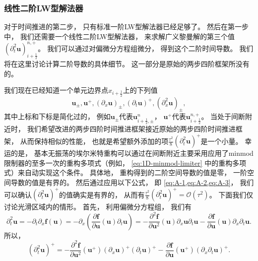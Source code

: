 \subsubsection{线性二阶LW型解法器}

对于时间推进的第二步，
只有标准一阶LW型解法器已经足够了。
然后在第一步中，
我们还需要一个线性二阶LW型解法器，
来求解广义黎曼解的第三个值$\left({\partial_{t}^2}{\bm{u}}\right)_{i+\frac{1}{2}}^{n, +}$。
我们可以通过对偏微分方程组微分，
得到这个二阶时间导数。
我们将在这里讨论计算二阶导数的具体细节。
这一部分是原始的两步四阶框架所没有的。

我们现在已经知道一个单元边界点$x_{i+\frac{1}{2}}$上的下列值
\begin{equation}
  {\bm{u}}_\pm, {\bm{u}}^+,\left({\partial_{x}}{\bm{u}}\right)_\pm, \left({\partial_{t}} {\bm{u}}\right)^+, \left({\partial_{x}^2}{\bm{u}}\right)_\pm,
\end{equation}
其中上标和下标是简化过的，
例如${\bm{u}}_\pm$代表${\bm{u}}_{i+\frac{1}{2},\pm}^n$，
${\bm{u}}^+$代表${\bm{u}}_{i+\frac{1}{2}}^{n,+}$。
当处于间断附近时，
我们希望改进的两步四阶时间推进框架接近原始的两步四阶时间推进框架，
从而保持相似的性能，
也就是希望额外添加的项$\frac{\tau^2}{8}\left({\partial_{t}^2} \bm{u}\right)^+$是一个小量。
幸运的是，
基本无振荡的埃尔米特重构可以通过在间断附近主要采用应用了minmod限制器的至多一次的重构多项式（例如，
\cref{eq:1D-minmod-limiter} 中的重构多项式）来自动实现这个条件。
具体地，
重构得到的二阶空间导数的值是零，
一阶空间导数的值是有界的。
然后通过应用以下公式，
即 \cref{eq:A-1,eq:A-2,eq:A-3}，
我们可以确认$\left({\partial_{t}^2} \bm{u}\right)^+$的值确实是有界的，
从而有$\frac{\tau^2}{8}\left({\partial_{t}^2} \bm{u}\right)^+=\mathcal{O}(\tau^2)$。
下面我们仅讨论光滑区域内的情形。
首先，
利用偏微分方程组，
我们有
\begin{equation}
  {\partial_{t}^2} {\bm{u}}
  = -{\partial_{t}}{\partial_{x}}{\bm{f}}({\bm{u}})
  = -{\partial_{x}}\left(\frac{\partial{\bm{f}}}{\partial{\bm{u}}}({\bm{u}}) {\partial_{t}}{\bm{u}}\right)
  = -\frac{\partial^2{\bm{f}}}{\partial{\bm{u}}^2}({\bm{u}}) {\partial_{x}}{\bm{u}} {\partial_{t}}{\bm{u}}
  -\frac{\partial{\bm{f}}}{\partial{\bm{u}}}({\bm{u}}) {\partial_{x}}{\partial_{t}}{\bm{u}}.
\end{equation}
所以，
\begin{equation}
  \label{eq:A-1}
  \left({\partial_{t}^2} {\bm{u}}\right)^+ = -\frac{\partial^2{\bm{f}}}{\partial{\bm{u}}^2}({\bm{u}}^+) \left({\partial_{x}}{\bm{u}}\right)^+ \left({\partial_{t}}{\bm{u}}\right)^+ -\frac{\partial{\bm{f}}}{\partial{\bm{u}}}({\bm{u}}^+) \left({\partial_{x}}{\partial_{t}}{\bm{u}}\right)^+.
\end{equation}
